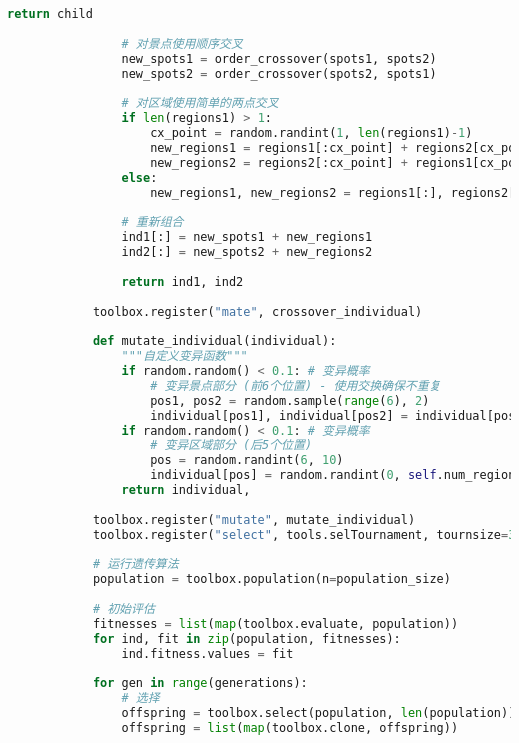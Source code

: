 \begin{lstlisting}[language=Python]
                    return child
                
                # 对景点使用顺序交叉
                new_spots1 = order_crossover(spots1, spots2)
                new_spots2 = order_crossover(spots2, spots1)
                
                # 对区域使用简单的两点交叉
                if len(regions1) > 1:
                    cx_point = random.randint(1, len(regions1)-1)
                    new_regions1 = regions1[:cx_point] + regions2[cx_point:]
                    new_regions2 = regions2[:cx_point] + regions1[cx_point:]
                else:
                    new_regions1, new_regions2 = regions1[:], regions2[:]
                
                # 重新组合
                ind1[:] = new_spots1 + new_regions1
                ind2[:] = new_spots2 + new_regions2
                
                return ind1, ind2
            
            toolbox.register("mate", crossover_individual)
    
            def mutate_individual(individual):
                """自定义变异函数"""
                if random.random() < 0.1: # 变异概率
                    # 变异景点部分 (前6个位置) - 使用交换确保不重复
                    pos1, pos2 = random.sample(range(6), 2)
                    individual[pos1], individual[pos2] = individual[pos2], individual[pos1]
                if random.random() < 0.1: # 变异概率
                    # 变异区域部分 (后5个位置)
                    pos = random.randint(6, 10)
                    individual[pos] = random.randint(0, self.num_regions-1)
                return individual,
            
            toolbox.register("mutate", mutate_individual)
            toolbox.register("select", tools.selTournament, tournsize=3)
            
            # 运行遗传算法
            population = toolbox.population(n=population_size)
            
            # 初始评估
            fitnesses = list(map(toolbox.evaluate, population))
            for ind, fit in zip(population, fitnesses):
                ind.fitness.values = fit
            
            for gen in range(generations):
                # 选择
                offspring = toolbox.select(population, len(population))
                offspring = list(map(toolbox.clone, offspring))
                

\end{lstlisting}
